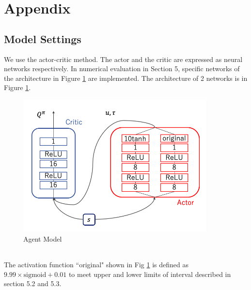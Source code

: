 \documentclass[english, dvipdfmx]{ampmt}             %
\def\numberofspines{1}
\begin{document}
\appendix

\section{Appendix}
\subsection{Model Settings}
We use the actor-critic method. The actor and the critic are expressed as neural networks respectively. In numerical evaluation in Section 5, specific networks of the architecture in Figure \ref{NN} are implemented. The architecture of 2 networks is in Figure \ref{NN}.
\begin{figure}[h]
	\centering
 	\includegraphics[width=10cm]{model.png}
 	\caption{Agent Model} \label{NN}
\end{figure}\\
The activation function ``original" shown in Fig \ref{NN} is defined as $9.99 \times \textrm{sigmoid} + 0.01$ to meet upper and lower limits of interval described in section 5.2 and 5.3.\par

\fi
\ifoutputcover
\cleardoublepage
\makecover                      %
\makespine[\numberofspines]     %
\fi
\ifoutputabstractforsubmission
\makeabstractforsubmission      %
\fi
\end{document}
